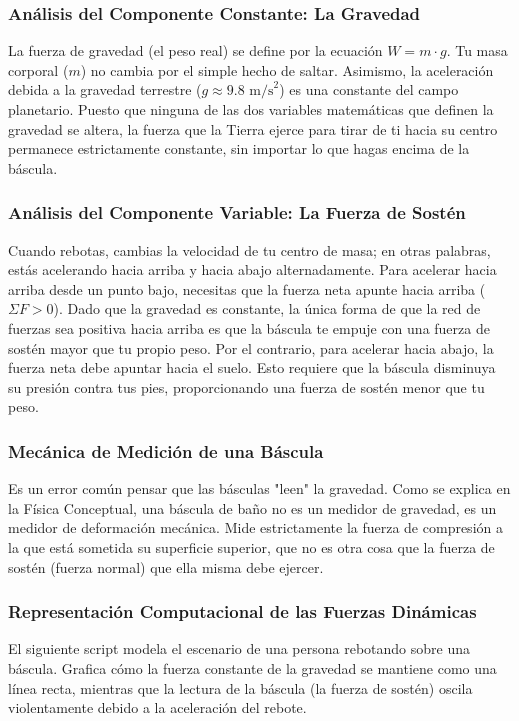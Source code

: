 \documentclass[12pt,letterpaper]{article}
\begin{document}
\subsubsection*{Análisis del Componente Constante: La Gravedad}
La fuerza de gravedad (el peso real) se define por la ecuación $W = m \cdot g$. Tu masa corporal ($m$) no cambia por el simple hecho de saltar. Asimismo, la aceleración debida a la gravedad terrestre ($g \approx 9.8 \text{ m/s}^2$) es una constante del campo planetario. Puesto que ninguna de las dos variables matemáticas que definen la gravedad se altera, la fuerza que la Tierra ejerce para tirar de ti hacia su centro permanece estrictamente constante, sin importar lo que hagas encima de la báscula.

\subsubsection*{Análisis del Componente Variable: La Fuerza de Sostén}
Cuando rebotas, cambias la velocidad de tu centro de masa; en otras palabras, estás acelerando hacia arriba y hacia abajo alternadamente. 
Para acelerar hacia arriba desde un punto bajo, necesitas que la fuerza neta apunte hacia arriba ($\Sigma F > 0$). Dado que la gravedad es constante, la única forma de que la red de fuerzas sea positiva hacia arriba es que la báscula te empuje con una fuerza de sostén mayor que tu propio peso. 
Por el contrario, para acelerar hacia abajo, la fuerza neta debe apuntar hacia el suelo. Esto requiere que la báscula disminuya su presión contra tus pies, proporcionando una fuerza de sostén menor que tu peso. 

\subsubsection*{Mecánica de Medición de una Báscula}
Es un error común pensar que las básculas "leen" la gravedad. Como se explica en la Física Conceptual, una báscula de baño no es un medidor de gravedad, es un medidor de deformación mecánica. Mide estrictamente la fuerza de compresión a la que está sometida su superficie superior, que no es otra cosa que la fuerza de sostén (fuerza normal) que ella misma debe ejercer.

\subsubsection*{Representación Computacional de las Fuerzas Dinámicas}
El siguiente script modela el escenario de una persona rebotando sobre una báscula. Grafica cómo la fuerza constante de la gravedad se mantiene como una línea recta, mientras que la lectura de la báscula (la fuerza de sostén) oscila violentamente debido a la aceleración del rebote.
\end{document}
